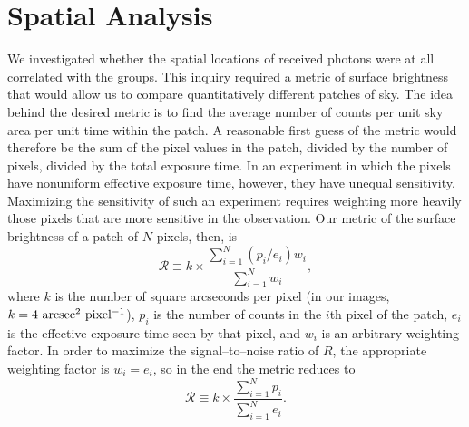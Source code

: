 \documentclass[12pt,preprint]{aastex}
\newcommand{\R}[0]{\mathcal{R}}
\begin{document}
\section{Spatial Analysis}
\label{sec:spatial}
We investigated whether the spatial locations of received photons were at
all correlated with the groups.  This inquiry required a metric of surface
brightness that would allow us to compare quantitatively different patches
of sky.  The idea behind the desired metric is to find the average number
of counts per unit sky area per unit time within the patch.  A reasonable
first guess of the metric would therefore be the sum of the pixel values in
the patch,
divided by the number of pixels, divided by the total exposure time.  In
an experiment in which the pixels have nonuniform effective exposure time,
however, they have unequal sensitivity.  Maximizing the sensitivity of
such an experiment requires weighting more heavily those pixels that are
more sensitive in the observation.  Our metric of the surface brightness
of a patch of $N$ pixels, then, is
\[
\R \equiv k \times \frac{\sum_{i=1}^N(p_i/e_i)w_i}{\sum_{i=1}^Nw_i},
\]
where $k$ is the number of square arcseconds per pixel (in our images,
$k = 4 {\rm~arcsec^2~pixel^{-1}}$), $p_i$ is the number of counts in the $i$th
pixel of the patch, $e_i$ is the effective exposure time seen by
that pixel, and $w_i$ is an arbitrary weighting factor.  In order to maximize
the signal--to--noise ratio of $R$, the appropriate weighting factor is
$w_i = e_i$, so in the end the metric reduces to
\begin{equation}
\label{eq:metric}
\R \equiv k \times \frac{\sum_{i=1}^Np_i}{\sum_{i=1}^Ne_i}.
\end{equation}
\end{document}
